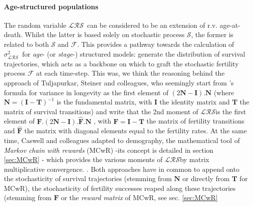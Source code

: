 \documentclass[10pt,a4paper]{article}
\newcommand{\LRO}{$\mathcal{LRS}$}
\newcommand{\vLRO}{$\sigma_{\mathrm{\mathcal{LRS}}}^2$}
\begin{document}
\paragraph{Age-structured populations} 
\label{sec:vLROagestr}
The random variable \LRO\ can be considered to be an extension of r.v. age-at-death. Whilst the latter is based solely on %
stochastic process $\mathcal{S}$, the former is related to both $\mathcal{S}$ and $\mathcal{F}$. This provides a pathway towards the calculation of \vLRO\ for \emph{age}- (or \emph{stage}-) structured models: generate the distribution of survival trajectories, which acts as a backbone on which to graft the stochastic fertility process $\mathcal{F}$ at each time-step. This was, we think the reasoning behind the approach of Tuljapurkar, Steiner and colleagues, who seemingly start from \citet{Caswell2006}'s formula for variance in longevity as the first element of $(2\mathbf{N}-\mathbf{I}).\mathbf{N}$ (where $\mathbf{N}=(\mathbf{I}-\mathbf{T})^{-1}$ is the fundamental matrix, with $\mathbf{I}$ the identity matrix and $\mathbf{T}$ the matrix of survival transitions) and write that the 2nd moment of \LRO is the first element of $ \mathbf{F}.(2\mathbf{N}-\mathbf{I}).\hat{\mathbf{F}}.\mathbf{N} $ \citep{Tuljapurkar2010,Steiner2012}, with $\mathbf{F}=\mathbf{I}-\mathbf{T}$ the matrix of fertility transitions and $\hat{\mathbf{F}}$ the matrix with diagonal elements equal to the fertility rates.
At the same time, Caswell and colleagues adapted to demography, the mathematical tool of \emph{Markov chain with rewards} (MCwR) -its concept is detailed in section \ref{sec:MCwR} - which provides the various moments of \LRO by matrix multiplicative convergence.%
\citep{Caswell2011b,Caswell2013,Caswell2014,vanDaalen2015,Caswell2015}.
Both approaches have in common to append onto the stochasticity of survival trajectories (stemming from $\mathbf{N}$ or directly from $\mathbf{T}$ for MCwR), the stochasticity of fertility successes %
reaped along these trajectories (stemming from $\mathbf{F}$ or the \emph{reward matrix} of MCwR, see sec. \ref{sec:MCwR}\\
\end{document}
